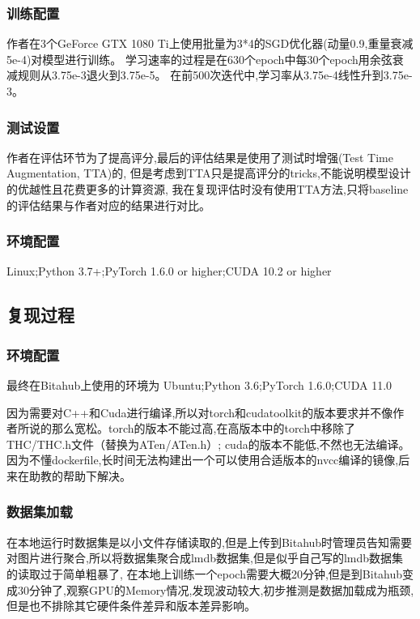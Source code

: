 \documentclass[10pt,a4paper]{article}%
\begin{document}
	\subsubsection*{训练配置}
	作者在3个GeForce GTX 1080 Ti上使用批量为3*4的SGD优化器(动量0.9,重量衰减5e-4)对模型进行训练。
	学习速率的过程是在630个epoch中每30个epoch用余弦衰减规则从3.75e-3退火到3.75e-5。
	在前500次迭代中,学习率从3.75e-4线性升到3.75e-3。\\
	\subsubsection*{测试设置}
	作者在评估环节为了提高评分,最后的评估结果是使用了测试时增强(Test Time Augmentation, TTA)的,
	但是考虑到TTA只是提高评分的tricks,不能说明模型设计的优越性且花费更多的计算资源,
	我在复现评估时没有使用TTA方法,只将baseline的评估结果与作者对应的结果进行对比。\\
	\subsubsection*{环境配置}
	Linux;Python 3.7+;PyTorch 1.6.0 or higher;CUDA 10.2 or higher

	\subsection{复现过程}
	\subsubsection*{环境配置}
	最终在Bitahub上使用的环境为	Ubuntu;Python 3.6;PyTorch 1.6.0;CUDA 11.0

	因为需要对C++和Cuda进行编译,所以对torch和cudatoolkit的版本要求并不像作者所说的那么宽松。torch的版本不能过高,在高版本中的torch中移除了THC/THC.h文件（替换为ATen/ATen.h）;
	cuda的版本不能低,不然也无法编译。因为不懂dockerfile,长时间无法构建出一个可以使用合适版本的nvcc编译的镜像,后来在助教的帮助下解决。\\
	\subsubsection*{数据集加载}
	在本地运行时数据集是以小文件存储读取的,但是上传到Bitahub时管理员告知需要对图片进行聚合,所以将数据集聚合成lmdb数据集,但是似乎自己写的lmdb数据集的读取过于简单粗暴了,
	在本地上训练一个epoch需要大概20分钟,但是到Bitahub变成30分钟了,观察GPU的Memory情况,发现波动较大,初步推测是数据加载成为瓶颈,但是也不排除其它硬件条件差异和版本差异影响。\\
\end{document}
